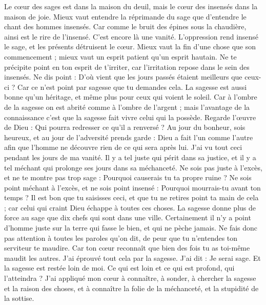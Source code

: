\begin{multicols}{2}
Le cœur des sages est dans la maison du deuil, mais le cœur des insensés dans la maison de joie.
Mieux vaut entendre la réprimande du sage que d'entendre le chant des hommes insensés.
Car comme le bruit des épines sous la chaudière, ainsi est le rire de l'insensé. C'est encore là une vanité.
L'oppression rend insensé le sage, et les présents détruisent le cœur.
Mieux vaut la fin d'une chose que son commencement ; mieux vaut un esprit patient qu'un esprit hautain.
Ne te précipite point en ton esprit de t'irriter, car l'irritation repose dans le sein des insensés.
Ne dis point : D'où vient que les jours passés étaient meilleurs que ceux-ci ? Car ce n'est point par sagesse que tu demandes cela.
La sagesse est aussi bonne qu'un héritage, et même plus pour ceux qui voient le soleil.
Car à l'ombre de la sagesse on est abrité comme à l'ombre de l'argent ; mais l'avantage de la connaissance c'est que la sagesse fait vivre celui qui la possède.
Regarde l'œuvre de Dieu : Qui pourra redresser ce qu'il a renversé ?
Au jour du bonheur, sois heureux, et au jour de l'adversité prends garde : Dieu a fait l'un comme l'autre afin que l'homme ne découvre rien de ce qui sera après lui.
J'ai vu tout ceci pendant les jours de ma vanité. Il y a tel juste qui périt dans sa justice, et il y a tel méchant qui prolonge ses jours dans sa méchanceté.
Ne sois pas juste à l'excès, et ne te montre pas trop sage : Pourquoi causerais tu ta propre ruine ?
Ne sois point méchant à l'excès, et ne sois point insensé : Pourquoi mourrais-tu avant ton temps ?
Il est bon que tu saisisses ceci, et que tu ne retires point ta main de cela ; car celui qui craint Dieu échappe à toutes ces choses.
La sagesse donne plus de force au sage que dix chefs qui sont dans une ville.
Certainement il n'y a point d'homme juste sur la terre qui fasse le bien, et qui ne pèche jamais.
Ne fais donc pas attention à toutes les paroles qu'on dit, de peur que tu n'entendes ton serviteur te maudire.
Car ton cœur reconnaît que bien des fois tu as toi-même maudit les autres.
J'ai éprouvé tout cela par la sagesse. J'ai dit : Je serai sage. Et la sagesse est restée loin de moi.
Ce qui est loin et ce qui est profond, qui l'atteindra ?
J'ai appliqué mon cœur à connaître, à sonder, à chercher la sagesse et la raison des choses, et à connaître la folie de la méchanceté, et la stupidité de la sottise.

\end{multicols}
